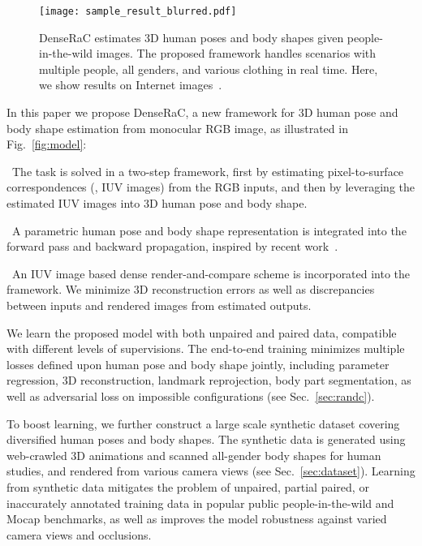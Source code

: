 \documentclass[10pt,twocolumn,letterpaper]{article}
\newcommand{\beforefigcaption}{\vspace{0mm}}
\newcommand{\afterfigcaption}{\vspace{0mm}}
\begin{document}
\begin{figure}[ptb]
\centering
\texttt{[image: sample\_result\_blurred.pdf]}
\beforefigcaption
\caption[DenseRaC estimates 3D human poses and body shapes given people-in-the-wild images. The proposed framework handles scenarios with multiple people, all genders, and various clothing in real time. Here, we show results on Internet images]{DenseRaC estimates 3D human poses and body shapes given people-in-the-wild images. The proposed framework handles scenarios with multiple people, all genders, and various clothing in real time. Here, we show results on Internet images~\cite{internetimages}.}
\afterfigcaption
\label{fig:intro}
\end{figure}

In this paper we propose DenseRaC, a new framework for 3D human pose and body shape estimation from monocular RGB image, as illustrated in Fig.~\ref{fig:model}:

\noindent {\small \textbullet} \, The task is solved in a two-step framework, first by estimating pixel-to-surface correspondences (\ie, IUV images) from the RGB inputs, and then by leveraging the estimated IUV images into 3D human pose and body shape. 

\noindent {\small \textbullet} \, A parametric human pose and body shape representation is integrated into the forward pass and backward propagation, inspired by recent work~\cite{kanazawa2018hmr,NeuralBodyFit18}.

\noindent {\small \textbullet} \, An IUV image based dense render-and-compare scheme is incorporated into the framework. We minimize 3D reconstruction errors as well as discrepancies between inputs and rendered images from estimated outputs.

We learn the proposed model with both unpaired and paired data, compatible with different levels of supervisions. The end-to-end training minimizes multiple losses defined upon human pose and body shape jointly, including parameter regression, 3D reconstruction, landmark reprojection, body part segmentation, as well as adversarial loss on impossible configurations (see Sec.~\ref{sec:randc}).

To boost learning, we further construct a large scale synthetic dataset covering diversified human poses and body shapes. The synthetic data is generated using web-crawled 3D animations and scanned all-gender body shapes for human studies, and rendered from various camera views (see Sec.~\ref{sec:dataset}). Learning from synthetic data mitigates the problem of unpaired, partial paired, or inaccurately annotated training data in popular public people-in-the-wild and Mocap benchmarks, as well as improves the model robustness against varied camera views and occlusions.
\end{document}

